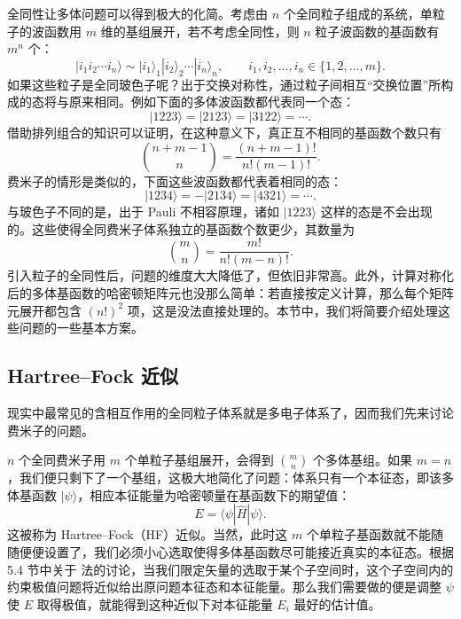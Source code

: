 全同性让多体问题可以得到极大的化简。考虑由 $n$ 个全同粒子组成的系统，单粒子的波函数用 $m$ 维的基组展开，若不考虑全同性，则 $n$ 粒子波函数的基函数有 $m^n$ 个：
\begin{equation}
 |i_1i_2\cdots i_n\rangle\sim |i_1\rangle_1|i_2\rangle_2\cdots|i_n\rangle_n,
 \qquad i_1,i_2,\ldots,i_n\in\{1,2,\ldots,m\}.
\tag{6.4.9}
\end{equation}
如果这些粒子是全同玻色子呢？出于交换对称性，通过粒子间相互“交换位置”所构成的态将与原来相同。例如下面的多体波函数都代表同一个态：
\begin{equation}
 |1223\rangle=|2123\rangle=|3122\rangle=\cdots.
\tag{6.4.10}
\end{equation}
借助排列组合的知识可以证明，在这种意义下，真正互不相同的基函数个数只有
\begin{equation}
 \binom{n+m-1}{n}=\frac{(n+m-1)!}{n!(m-1)!}.
\tag{6.4.11}
\end{equation}
费米子的情形是类似的，下面这些波函数都代表着相同的态：
\begin{equation}
 |1234\rangle=-|2134\rangle=|4321\rangle=\cdots.
\tag{6.4.12}
\end{equation}
与玻色子不同的是，出于 Pauli 不相容原理，诸如 $|1223\rangle$ 这样的态是不会出现的。这些使得全同费米子体系独立的基函数个数更少，其数量为
\begin{equation}
 \binom{m}{n}=\frac{m!}{n!(m-n)!}.
\tag{6.4.13}
\end{equation}
引入粒子的全同性后，问题的维度大大降低了，但依旧非常高。此外，计算对称化后的多体基函数的哈密顿矩阵元也没那么简单：若直接按定义计算，那么每个矩阵元展开都包含 $(n!)^2$ 项，这是没法直接处理的。本节中，我们将简要介绍处理这些问题的一些基本方案。

\subsection{Hartree--Fock 近似}

现实中最常见的含相互作用的全同粒子体系就是多电子体系了，因而我们先来讨论费米子的问题。

$n$ 个全同费米子用 $m$ 个单粒子基组展开，会得到 $\binom{m}{n}$ 个多体基组。如果 $m=n$，我们便只剩下了一个基组，这极大地简化了问题：体系只有一个本征态，即该多体基函数 $|\psi\rangle$，相应本征能量为哈密顿量在基函数下的期望值：
\begin{equation}
 E=\langle\psi|\hat H|\psi\rangle.
\tag{6.4.14}
\end{equation}
这被称为 Hartree--Fock（HF）近似。当然，此时这 $m$ 个单粒子基函数就不能随随便便设置了，我们必须小心选取使得多体基函数尽可能接近真实的本征态。根据 5.4 节中关于  法的讨论，当我们限定矢量的选取于某个子空间时，这个子空间内的约束极值问题将近似给出原问题本征态和本征能量。那么我们需要做的便是调整 $\psi$ 使 $E$ 取得极值，就能得到这种近似下对本征能量 $E_i$ 最好的估计值。

